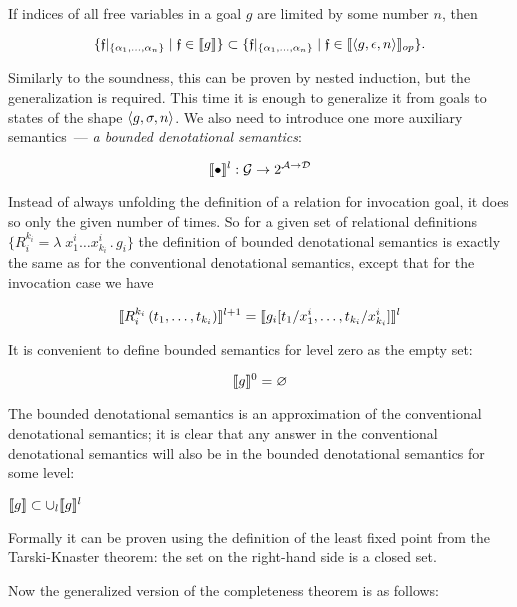 \begin{theorem}
If indices of all free variables in a goal $g$ are limited by some number $n$, then

\[
\{\mathfrak{f}|_{\{\alpha_1,\dots,\alpha_n\}} \mid \mathfrak{f} \in \llbracket{g}\rrbracket\} \subset \{\mathfrak{f}|_{\{\alpha_1,\dots,\alpha_n\}} \mid \mathfrak{f} \in \llbracket{\left<{g, \epsilon, n}\right>}\rrbracket_{op}\}.
\]
\end{theorem}


Similarly to the soundness, this can be proven by nested induction, but the generalization is required. This time it is enough to generalize it from goals
to states of the shape $\left<{g, \sigma, n}\right>$. We also need to introduce one more auxiliary semantics~--- \emph{a bounded denotational semantics}:

\[
\llbracket{\bullet}\rrbracket^l : \mathcal{G} \to 2^{\mathcal{A}\to\mathcal{D}}
\]

Instead of always unfolding the definition of a relation for invocation goal, it does so only the given number of times. So for a given set of relational
definitions $\{R_i^{k_i} = \lambda\;x_1^i\dots x_{k_i}^i\,.\, g_i\}$ the definition of bounded denotational semantics is exactly the same as for the conventional denotational semantics,
except that for the invocation case we have

\[
\llbracket{R_i^{k_i}\,(t_1,\dots,t_{k_i})}\rrbracket^{l+1} = \llbracket{g_i[t_1/x_1^i, \dots, t_{k_i}/x_{k_i}^i]}\rrbracket^{l}
\]

It is convenient to define bounded semantics for level zero as the empty set:

\[
\llbracket{g}\rrbracket^{0} = \varnothing
\]

The bounded denotational semantics is an approximation of the conventional denotational semantics; it is clear that any answer in the conventional denotational semantics will also be in
the bounded denotational semantics for some level:

\begin{lemma}
$\llbracket{g}\rrbracket \subset \cup_l \llbracket{g}\rrbracket^l$
\end{lemma}

Formally it can be proven using the definition of the least fixed point from the Tarski-Knaster theorem: the set on the right-hand side is a closed set.

Now the generalized version of the completeness theorem is as follows:

